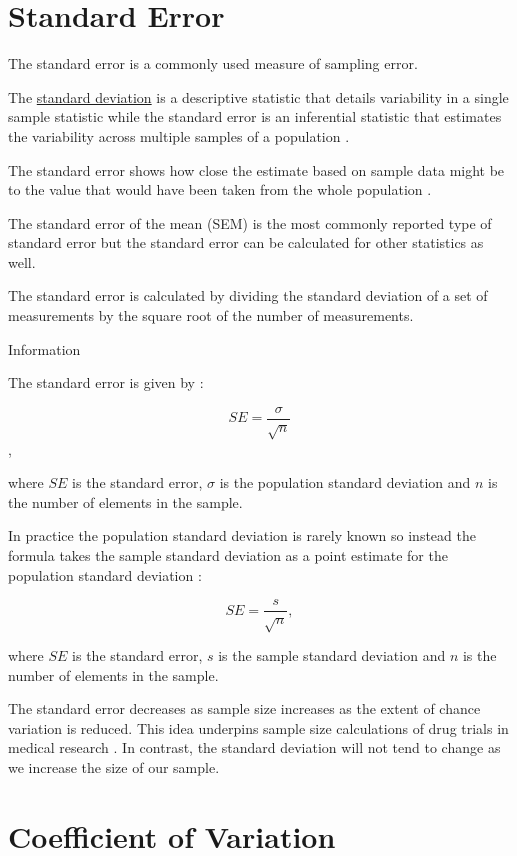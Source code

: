 \documentclass[
]{book}
\begin{document}
\hypertarget{stderr}{%
\section{Standard Error}\label{stderr}}

The standard error is a commonly used measure of sampling error.

The \protect\hyperlink{stdv}{standard deviation} is a descriptive statistic that details variability in a single sample statistic while the standard error is an inferential statistic that estimates the variability across multiple samples of a population \citep{lee}.

The standard error shows how close the estimate based on sample data might be to the value that would have been taken from the whole population \citep{uncertainty}.

The standard error of the mean (SEM) is the most commonly reported type of standard error but the standard error can be calculated for other statistics as well.

The standard error is calculated by dividing the standard deviation of a set of measurements by the square root of the number of measurements.

Information

The standard error is given by \citep{uncertainty}:

\[SE=\frac{\sigma}{\sqrt{n}}\],

where \(SE\) is the standard error, \(\sigma\) is the population standard deviation and \(n\) is the number of elements in the sample.

In practice the population standard deviation is rarely known so instead the formula takes the sample standard deviation as a point estimate for the population standard deviation \citep{uncertainty}:

\[SE=\frac{s}{\sqrt{n}},\]

where \(SE\) is the standard error, \(s\) is the sample standard deviation and \(n\) is the number of elements in the sample.

The standard error decreases as sample size increases as the extent of chance variation is reduced. This idea underpins sample size calculations of drug trials in medical research \citep{bmj}. In contrast, the standard deviation will not tend to change as we increase the size of our sample.

\hypertarget{coeff}{%
\section{Coefficient of Variation}\label{coeff}}
\end{document}
